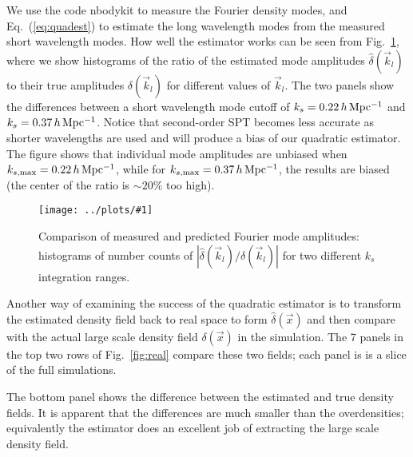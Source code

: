 \documentclass[prd,amsmath,amssymb,floatfix,superscriptaddress,nofootinbib,twocolumn]{revtex4-1}
\newcommand{\vk}{\vec{k}}
\newcommand{\ec}[1]{Eq.~(\ref{eq:#1})}
\newcommand{\rf}[1]{\ref{fig:#1}}
\newcommand{\sfig}[2]{
\texttt{[image: ../plots/\#1]}
        }
\newcommand{\Sfig}[2]{
   \begin{figure}[thbp]
   \begin{center}
    \sfig{../plots/#1.pdf}{\columnwidth}
    \caption{{\small #2}}
    \label{fig:#1}
     \end{center}
   \end{figure}
}
\newcommand{\peikai}[1]{{\color{blue} #1}}
\newcommand{\RC}[1]{{\color{darkorange} #1}}
\begin{document}
We use the code nbodykit \cite{Hand:2018nby} to measure the Fourier density modes, and \ec{quadest} to estimate the long wavelength modes  from the measured short wavelength modes. How well the estimator works can be seen from Fig.~\rf{hist}, where we show histograms of the ratio of the estimated mode amplitudes $\hat{\delta}(\vk_l)$ to their true amplitudes $\delta(\vk_l)$ for different values of $\vk_l$. The two panels show the differences between a short wavelength mode cutoff of $k_s=0.22\, h\, \rm Mpc^{-1}$ and  $k_s=0.37\,h\, \rm Mpc^{-1}$. Notice that second-order SPT becomes less accurate as shorter wavelengths are used and will produce a bias of our quadratic estimator. The figure shows that individual mode amplitudes are  unbiased when $k_{s,\rm max}= 0.22\,h\, \rm Mpc^{-1}$, while for $k_{s,\rm max}=0.37\,h\, \rm Mpc^{-1}$, the results are biased (the center of the ratio is $\sim 20 \%$ too high). %
\Sfig{hist}{Comparison of measured and predicted Fourier mode amplitudes: histograms of number counts of $|\hat{\delta}(\vk_l)/\delta(\vk_l)|$ for two different $k_s$ integration ranges.}

Another way of examining the success of the quadratic estimator is to transform the estimated density field back to real space to form $\hat\delta(\vec x)$ and then compare with the actual large scale density field $\delta(\vec x)$ in the simulation. The 7 panels in the top two rows of Fig.~\rf{real} compare these two fields; each panel is is a slice of the full simulations.

The bottom panel shows the difference between the estimated and true density fields. It is apparent that the differences are much smaller than the overdensities; equivalently the estimator does an excellent job of extracting the large scale density field.
\end{document}
